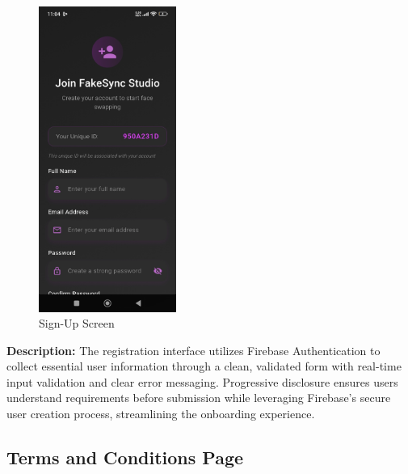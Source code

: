 \documentclass[12pt,a4paper]{report}
\begin{document}
\begin{figure}[H]
\centering
\includegraphics[width=0.4\textwidth]{figures/signup_screen.png}
\caption{Sign-Up Screen}
\label{fig:signup_screen}
\end{figure}

\textbf{Description:} The registration interface utilizes Firebase Authentication to collect essential user information through a clean, validated form with real-time input validation and clear error messaging. Progressive disclosure ensures users understand requirements before submission while leveraging Firebase's secure user creation process, streamlining the onboarding experience.

\subsection{Terms and Conditions Page}
\end{document}
